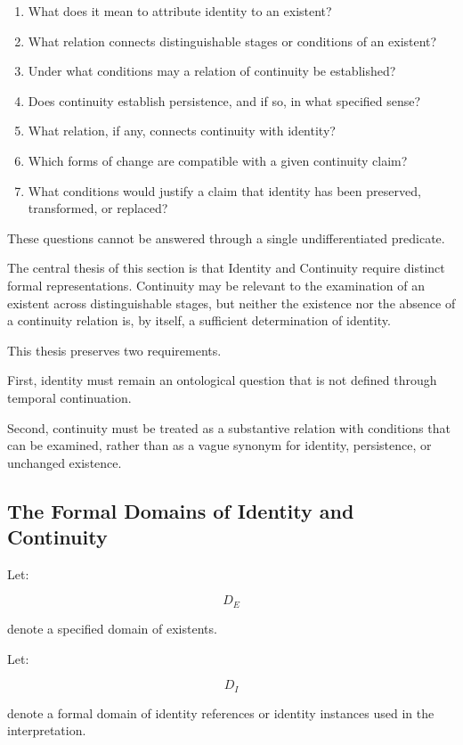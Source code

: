 \begin{enumerate}
    \item What does it mean to attribute identity to
    an existent?
    \item What relation connects distinguishable stages
    or conditions of an existent?
    \item Under what conditions may a relation of
    continuity be established?
    \item Does continuity establish persistence, and
    if so, in what specified sense?
    \item What relation, if any, connects continuity
    with identity?
    \item Which forms of change are compatible with
    a given continuity claim?
    \item What conditions would justify a claim that
    identity has been preserved, transformed, or
    replaced?
\end{enumerate}

These questions cannot be answered through a single
undifferentiated predicate.

The central thesis of this section is that Identity
and Continuity require distinct formal representations.
Continuity may be relevant to the examination of an
existent across distinguishable stages, but neither
the existence nor the absence of a continuity relation
is, by itself, a sufficient determination of identity.

This thesis preserves two requirements.

First, identity must remain an ontological question
that is not defined through temporal continuation.

Second, continuity must be treated as a substantive
relation with conditions that can be examined,
rather than as a vague synonym for identity, persistence,
or unchanged existence.

\subsection{The Formal Domains of Identity and Continuity}

Let:

\[
    D_E
\]

denote a specified domain of existents.

Let:

\[
    D_I
\]

denote a formal domain of identity references or
identity instances used in the interpretation.

